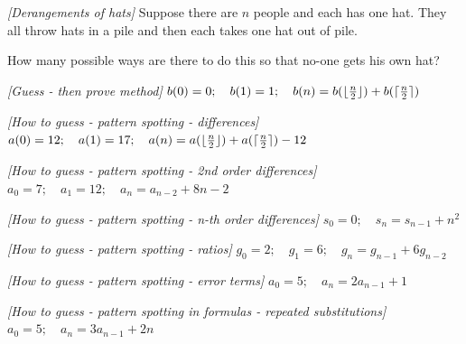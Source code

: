 

%

\renewcommand{\theenumi}{\alph{enumi}}



\noindent
 
\filbreak

\begin{problem}
\textit{[Derangements of hats]}
Suppose there are $n$ people and each has one hat. They all throw hats in a pile and then each takes one hat out of pile. 

How many possible ways are there to do this so that no-one gets his  own hat? 
\end{problem}
%

\begin{problem}
\textit{[Guess - then prove method]}
$
b(0)=0; \quad b(1)=1; \quad
b(n)=b(\lfloor\frac{n}{2}\rfloor)+b(\lceil\frac{n}{2}\rceil)
$
\end{problem}
%

\begin{problem}
\textit{[How to guess - pattern spotting - differences]}
$
a(0)=12; \quad
a(1)=17; \quad
a(n)=a(\lfloor\frac{n}{2}\rfloor)+a(\lceil\frac{n}{2}\rceil)-12
$
\end{problem}
%

\begin{problem}
\textit{[How to guess - pattern spotting - 2nd order differences]}
$
a_0=7; \quad
a_1=12; \quad
a_n=a_{n-2}+8n-2
$
\end{problem}
%

\begin{problem}
\textit{[How to guess - pattern spotting - n-th order differences]}
$
s_0=0; \quad
s_n=s_{n-1}+n^2
$
\end{problem}
%

\begin{problem}
\textit{[How to guess - pattern spotting - ratios]}
$
g_0=2; \quad
g_1=6; \quad
g_n=g_{n-1}+6g_{n-2}
$
\end{problem}
%

\begin{problem}
\textit{[How to guess - pattern spotting - error terms]}
$
a_0=5; \quad
a_n=2a_{n-1}+1
$
\end{problem}
%

\begin{problem}
\textit{[How to guess - pattern spotting in formulas - repeated substitutions]}
$
a_0=5; \quad
a_n=3a_{n-1}+2n
$
\end{problem}

